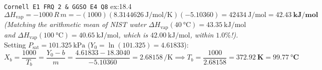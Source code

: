 \begin{workedexample}{\texttt{Cornell E1 FRQ 2 \& GGSO E4 Q8} }{ex:18.4}
$$\Delta H_{\mathrm{vap}} = -1000\,R\,m = -(1000)(\SI{8.3144626}{\joule\per\mole\per\kelvin})(-5.10360) = \SI{42434}{\joule\per\mole} = \mathbf{\SI{42.43}{\kilo\joule\per\mole}}$$
\emph{(Matching the arithmetic mean of NIST water $\Delta H_{\mathrm{vap}}(\SI{40}{\celsius}) = \SI{43.35}{\kilo\joule\per\mole}$ and $\Delta H_{\mathrm{vap}}(\SI{100}{\celsius}) = \SI{40.65}{\kilo\joule\per\mole}$, which is $\SI{42.00}{\kilo\joule\per\mole}$, within $1.0\%$!).} Setting $P_{\mathrm{sat}} = \SI{101.325}{\kilo\pascal}$ ($Y_0 = \ln(101.325) = 4.61833$):
$$X_b = \frac{1000}{T_b} = \frac{Y_0 - b}{m} = \frac{4.61833 - 18.3040}{-5.10360} = 2.68158\,\si{\per\kelvin} \implies T_b = \frac{1000}{2.68158} = \mathbf{\SI{372.92}{\kelvin}} = \mathbf{\SI{99.77}{\celsius}}$$
\end{workedexample}

